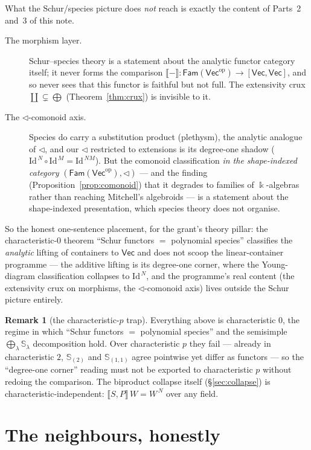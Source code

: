 \documentclass[11pt]{amsart}
\theoremstyle{plain}
\theoremstyle{definition}
\newtheorem{remark}[theorem]{Remark}
\renewcommand{\Vec}{\mathsf{Vec}}
\newcommand{\Fam}{\mathsf{Fam}}
\newcommand{\op}{\mathrm{op}}
\newcommand{\Id}{\mathrm{Id}}
\newcommand{\ext}[1]{\llbracket #1 \rrbracket}
\newcommand{\fld}{\Bbbk}
\newcommand{\bul}{{-}}
\DeclareMathOperator{\dcoprod}{\textstyle\coprod}
\begin{document}
What the Schur/species picture does \emph{not} reach is exactly the content of
Parts~2 and~3 of this note.
\begin{description}
\item[The morphism layer.] Schur--species theory is a statement about the
  analytic functor category itself; it never forms the comparison
  $\ext{\bul}\colon\Fam(\Vec^\op)\to[\Vec,\Vec]$, and so never sees that this
  functor is faithful but not full. The extensivity crux
  $\dcoprod\subsetneq\bigoplus$ (Theorem~\ref{thm:crux}) is invisible to it.
\item[The $\lhd$-comonoid axis.] Species do carry a substitution product
  (plethysm), the analytic analogue of $\lhd$, and our $\lhd$ restricted to
  extensions is its degree-one shadow ($\Id^{\,N}\circ\Id^{\,M}=\Id^{\,NM}$).
  But the comonoid classification \emph{in the shape-indexed category}
  $(\Fam(\Vec^\op),\lhd)$ --- and the finding (Proposition~\ref{prop:comonoid})
  that it degrades to families of $\fld$-algebras rather than reaching
  Mitchell's algebroids --- is a statement about the shape-indexed presentation,
  which species theory does not organise.
\end{description}

So the honest one-sentence placement, for the grant's theory pillar: the
characteristic-$0$ theorem ``Schur functors $=$ polynomial species'' classifies
the \emph{analytic} lifting of containers to $\Vec$ and does not scoop the
linear-container programme --- the additive lifting is its degree-one corner,
where the Young-diagram classification collapses to $\Id^{\,N}$, and the
programme's real content (the extensivity crux on morphisms, the
$\lhd$-comonoid axis) lives outside the Schur picture entirely.

\begin{remark}[the characteristic-$p$ trap]\label{rem:charp}
Everything above is characteristic $0$, the regime in which ``Schur functors $=$
polynomial species'' and the semisimple $\bigoplus_\lambda\mathbb S_\lambda$
decomposition hold. Over characteristic $p$ they fail --- already in
characteristic $2$, $\mathbb S_{(2)}$ and $\mathbb S_{(1,1)}$ agree pointwise yet
differ as functors --- so the ``degree-one corner'' reading must not be exported
to characteristic $p$ without redoing the comparison. The biproduct collapse
itself (\S\ref{sec:collapse}) is characteristic-independent: $\ext{S,P}\,W=W^{\,N}$
over any field.
\end{remark}

\section{The neighbours, honestly}\label{sec:neighbours}
\end{document}
